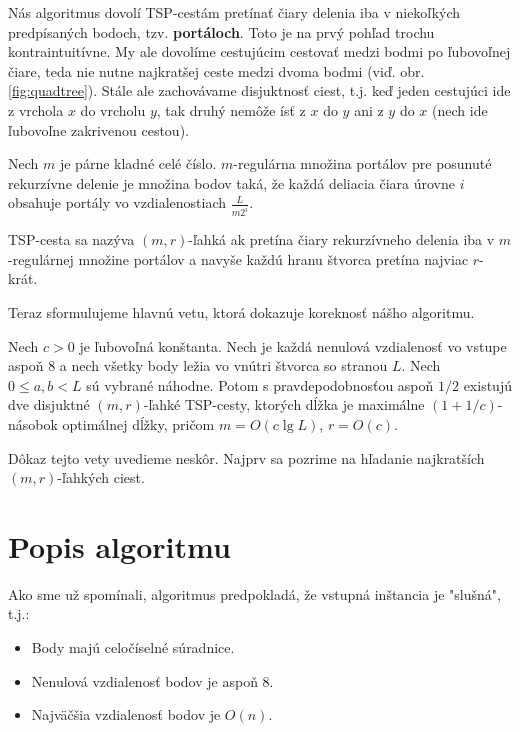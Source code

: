 Nás algoritmus dovolí TSP-cestám pretínať čiary delenia iba v niekoľkých
predpísaných bodoch, tzv. {\bf portáloch}. Toto je na prvý pohľad trochu kontraintuitívne.
My ale dovolíme cestujúcim cestovať medzi bodmi po ľubovoľnej čiare, teda nie nutne najkratšej
ceste medzi dvoma bodmi (viď. obr. \ref{fig:quadtree}). Stále ale zachovávame disjuktnosť ciest, t.j. keď
jeden cestujúci ide z vrchola $x$ do vrcholu $y$, tak druhý nemôže ísť z $x$ do $y$ ani z $y$ do
$x$ (nech ide ľubovoľne zakrivenou cestou). 

\begin{definicia}
Nech $m$ je párne kladné celé číslo. $m$-regulárna množina portálov pre posunuté rekurzívne
delenie je množina bodov taká, že každá deliacia čiara úrovne $i$ obsahuje portály vo
vzdialenostiach $\frac{L}{m2^i}$. 
\end{definicia}


\begin{definicia}
TSP-cesta sa nazýva $(m,r)$-ľahká ak pretína čiary rekurzívneho delenia iba v $m$-regulárnej
množine portálov a navyše každú hranu štvorca pretína najviac $r$-krát.
\end{definicia}

Teraz sformulujeme hlavnú vetu, ktorá dokazuje koreknosť nášho algoritmu.

\begin{veta}
Nech $c > 0$ je ľubovoľná konštanta. Nech je každá nenulová vzdialenosť vo vstupe aspoň $8$ a nech všetky
body ležia vo vnútri štvorca so stranou $L$. Nech $0 \leq a, b < L$ sú vybrané náhodne. Potom s
pravdepodobnosťou aspoň $1/2$ existujú dve disjuktné $(m,r)$-ľahké TSP-cesty, ktorých dĺžka je maximálne $(1 +
1/c)$-násobok optimálnej dĺžky, pričom $m = O(c \lg L)$, $r = O(c)$.
\end{veta}

Dôkaz tejto vety uvedieme neskôr. 
Najprv sa pozrime na hľadanie najkratších $(m, r)$-ľahkých ciest.

\section{Popis algoritmu}

Ako sme už spomínali, algoritmus predpokladá, že vstupná inštancia je "slušná", t.j.:
\begin{itemize}
\item Body majú celočíselné súradnice.
\item Nenulová vzdialenosť bodov je aspoň 8.
\item Najväčšia vzdialenosť bodov je $O(n)$.
\end{itemize}

